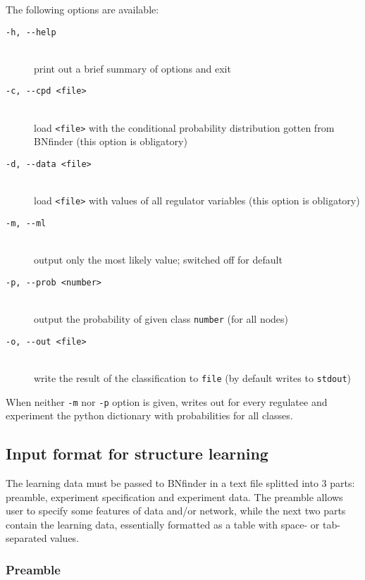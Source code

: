 The following options are available:
\begin{description}
\item[\texttt{-h, -\hspace{0pt}-help}]~\\
 print out a brief summary of options and exit
\item[\texttt{-c, -\hspace{0pt}-cpd <file>}]~\\
 load \texttt{<file>} with the conditional probability distribution gotten from BNfinder (this option is obligatory)
\item[\texttt{-d, -\hspace{0pt}-data <file>}]~\\
 load \texttt{<file>} with values of all regulator variables (this option is obligatory)
\item[\texttt{-m, -\hspace{0pt}-ml}]~\\
 output only the most likely value; switched off for default
\item[\texttt{-p, -\hspace{0pt}-prob <number>}]~\\
 output the probability of given class \texttt{number} (for all nodes)
\item[\texttt{-o, -\hspace{0pt}-out <file>}]~\\
 write the result of the classification to \texttt{file} (by default writes to \texttt{stdout})
\end{description}

When neither \texttt{-m} nor \texttt{-p} option is given, writes out for every regulatee and experiment the python dictionary with probabilities for all classes.

\subsection{Input format for structure learning}

 The learning data must be passed to BNfinder in a text file splitted into 3 parts: preamble, experiment specification and experiment data.
 The preamble allows user to specify some features of data and/or network, while the next two parts contain the learning data, essentially formatted as a table with space- or tab-separated values.

\subsubsection{Preamble}

